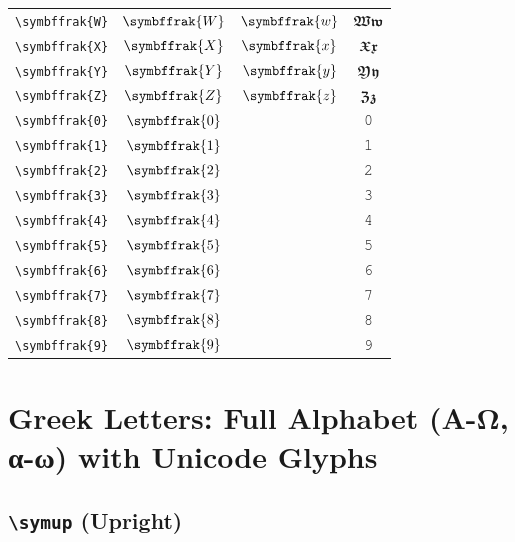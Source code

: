 \documentclass[12pt,a4paper]{article}
\begin{document}
\begin{longtable}{|c|c|c|c|}
\verb|\symbffrak{W}| & $\symbffrak{W}$ & $\symbffrak{w}$ & $ 𝖂 𝖜 $ \\
\verb|\symbffrak{X}| & $\symbffrak{X}$ & $\symbffrak{x}$ & $ 𝖃 𝖝 $ \\
\verb|\symbffrak{Y}| & $\symbffrak{Y}$ & $\symbffrak{y}$ & $ 𝖄 𝖞 $ \\
\verb|\symbffrak{Z}| & $\symbffrak{Z}$ & $\symbffrak{z}$ & $ 𝖅 𝖟 $ \\
\verb|\symbffrak{0}| & $\symbffrak{0}$ & & 𝟶 \\
\verb|\symbffrak{1}| & $\symbffrak{1}$ & & 𝟷 \\
\verb|\symbffrak{2}| & $\symbffrak{2}$ & & 𝟸 \\
\verb|\symbffrak{3}| & $\symbffrak{3}$ & & 𝟹 \\
\verb|\symbffrak{4}| & $\symbffrak{4}$ & & 𝟺 \\
\verb|\symbffrak{5}| & $\symbffrak{5}$ & & 𝟻 \\
\verb|\symbffrak{6}| & $\symbffrak{6}$ & & 𝟼 \\
\verb|\symbffrak{7}| & $\symbffrak{7}$ & & 𝟽 \\
\verb|\symbffrak{8}| & $\symbffrak{8}$ & & 𝟾 \\
\verb|\symbffrak{9}| & $\symbffrak{9}$ & & 𝟿 \\
\hline
\end{longtable}

\newpage

\section*{Greek Letters: Full Alphabet (Α-Ω, α-ω) with Unicode Glyphs}

\subsection*{\texttt{\textbackslash{}symup} (Upright)}
\end{document}
